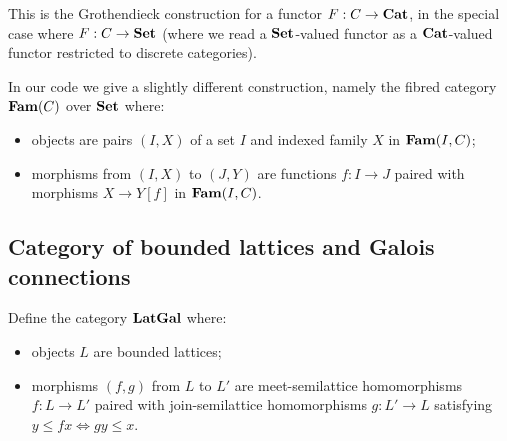 \documentclass[nonacm]{acmart}
\begin{document}
\noindent This is the Grothendieck construction for a functor $F: C \to \mathbf{Cat}$, in the special case where $F: C
\to \mathbf{Set}$ (where we read a $\mathbf{Set}$-valued functor as a $\mathbf{Cat}$-valued functor restricted to discrete
categories).

In our code we give a slightly different construction, namely the fibred category $\mathbf{Fam}(C)$ over $\mathbf{Set}$ where:
\begin{itemize}
\item objects are pairs $(I, X)$ of a set $I$ and indexed family $X$ in $\mathbf{Fam}(I,C)$;
\item morphisms from $(I, X)$ to $(J, Y)$ are functions $f: I \to J$ paired with morphisms $X \to Y[f]$ in
$\mathbf{Fam}(I,C)$.
\end{itemize}

\noindent {}

\subsection{Category of bounded lattices and Galois connections}

Define the category $\mathbf{LatGal}$ where:
\begin{itemize}
\item objects $L$ are bounded lattices;
\item morphisms $(f, g)$ from $L$ to $L'$ are meet-semilattice homomorphisms $f: L \to L'$ paired with
join-semilattice homomorphisms $g: L' \to L$ satisfying $y \leq fx \iff gy \leq x$.
\end{itemize}
\end{document}
